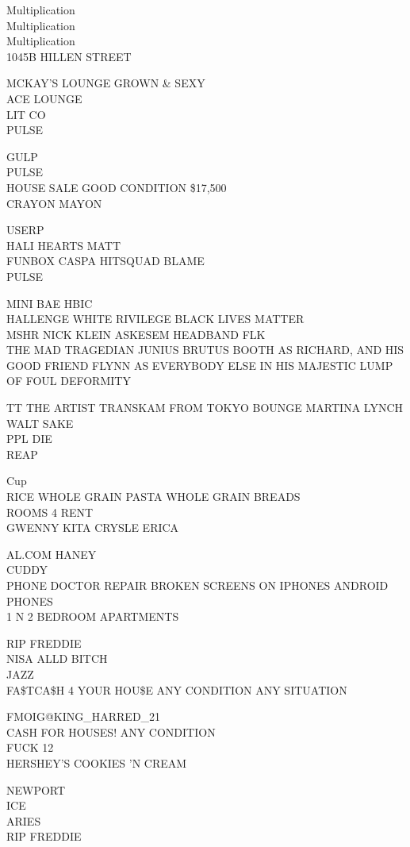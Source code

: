 \documentclass[10pt,letterpaper]{article}
\begin{document}
Multiplication\\
Multiplication\\
Multiplication\\
1045B HILLEN STREET

MCKAY'S LOUNGE GROWN \& SEXY\\
ACE LOUNGE\\
LIT CO\\
PULSE

GULP\\
PULSE\\
HOUSE SALE GOOD CONDITION \$17,500\\
CRAYON MAYON

USERP\\
HALI HEARTS MATT\\
FUNBOX CASPA HITSQUAD BLAME\\
PULSE

MINI BAE HBIC\\
HALLENGE WHITE RIVILEGE BLACK LIVES MATTER\\
MSHR NICK KLEIN ASKESEM HEADBAND FLK\\
THE MAD TRAGEDIAN JUNIUS BRUTUS BOOTH AS RICHARD, AND HIS GOOD FRIEND FLYNN AS EVERYBODY ELSE IN HIS MAJESTIC LUMP OF FOUL DEFORMITY

TT THE ARTIST TRANSKAM FROM TOKYO BOUNGE MARTINA LYNCH\\
WALT SAKE\\
PPL DIE\\
REAP

Cup\\
RICE WHOLE GRAIN PASTA WHOLE GRAIN BREADS\\
ROOMS 4 RENT\\
GWENNY KITA CRYSLE ERICA

AL.COM HANEY\\
CUDDY\\
PHONE DOCTOR REPAIR BROKEN SCREENS ON IPHONES ANDROID PHONES\\
1 N 2 BEDROOM APARTMENTS

RIP FREDDIE\\
NISA ALLD BITCH\\
JAZZ\\
FA\$TCA\$H 4 YOUR HOU\$E ANY CONDITION ANY SITUATION

FMOIG@KING\_HARRED\_21\\
CASH FOR HOUSES!  ANY CONDITION\\
FUCK 12\\
HERSHEY'S COOKIES 'N CREAM

NEWPORT\\
ICE\\
ARIES\\
RIP FREDDIE
\end{document}
